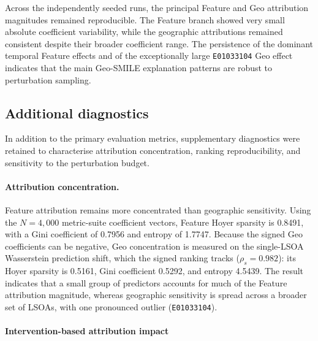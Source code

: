
Across the independently seeded runs, the principal Feature and Geo
attribution magnitudes remained reproducible. The Feature branch showed
very small absolute coefficient variability, while the geographic
attributions remained consistent despite their broader coefficient range.
The persistence of the dominant temporal Feature effects and of the
exceptionally large \texttt{E01033104} Geo effect indicates that the main Geo-SMILE explanation patterns are robust to perturbation
sampling.


\subsection{Additional diagnostics}
\label{sec:hull_additional_metrics}

In addition to the primary evaluation metrics, supplementary diagnostics were
retained to characterise attribution concentration, ranking reproducibility,
and sensitivity to the perturbation budget.

\paragraph{Attribution concentration.}
Feature attribution remains more concentrated than geographic sensitivity.
Using the $N=4{,}000$ metric-suite coefficient vectors, Feature Hoyer sparsity
is 0.8491, with a Gini coefficient of 0.7956 and entropy of 1.7747. Because the
signed Geo coefficients can be negative, Geo concentration is measured on
the single-LSOA Wasserstein prediction shift, which the signed ranking tracks
($\rho_s=0.982$): its Hoyer sparsity is 0.5161, Gini coefficient 0.5292,
and entropy 4.5439. The result indicates that a small group of predictors
accounts for much of the Feature attribution magnitude, whereas geographic
sensitivity is spread across a broader set of LSOAs, with one pronounced
outlier (\texttt{E01033104}).

\paragraph{Intervention-based attribution impact}

